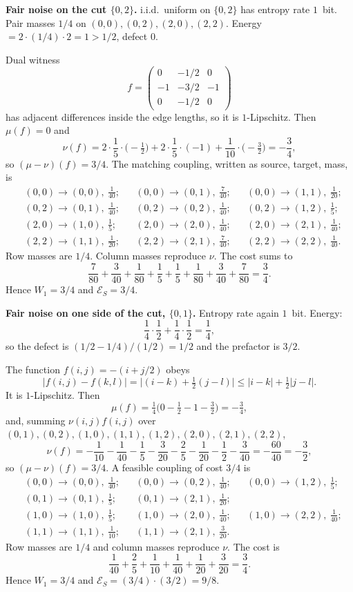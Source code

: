 \documentclass[11pt,reqno]{amsart}
\theoremstyle{remark}
\newcommand{\ES}{\mathcal{E}_S}
\begin{document}
\medskip\noindent\textbf{Fair noise on the cut $\{0,2\}$.} i.i.d.\ uniform on $\{0,2\}$ has entropy rate $1$~bit. Pair masses $1/4$ on $(0,0),(0,2),(2,0),(2,2)$. Energy $= 2\cdot(1/4)\cdot 2 = 1 > 1/2$, defect $0$.

Dual witness
\[
f = \begin{pmatrix}
0 & -1/2 & 0 \\
-1 & -3/2 & -1 \\
0 & -1/2 & 0
\end{pmatrix}
\]
has adjacent differences inside the edge lengths, so it is $1$-Lipschitz. Then $\mu(f) = 0$ and
\[
\nu(f)
= 2\cdot\frac15\cdot\bigl(-\tfrac12\bigr)
+ 2\cdot\frac15\cdot(-1)
+ \frac{1}{10}\cdot\bigl(-\tfrac32\bigr)
= -\frac{3}{4},
\]
so $(\mu-\nu)(f) = 3/4$. The matching coupling, written as source, target, mass, is
\begin{align*}
&(0,0)\to(0,0),\ \tfrac{1}{40};
&&(0,0)\to(0,1),\ \tfrac{7}{40};
&&(0,0)\to(1,1),\ \tfrac{1}{20};\\
&(0,2)\to(0,1),\ \tfrac{1}{40};
&&(0,2)\to(0,2),\ \tfrac{1}{40};
&&(0,2)\to(1,2),\ \tfrac15;\\
&(2,0)\to(1,0),\ \tfrac15;
&&(2,0)\to(2,0),\ \tfrac{1}{40};
&&(2,0)\to(2,1),\ \tfrac{1}{40};\\
&(2,2)\to(1,1),\ \tfrac{1}{20};
&&(2,2)\to(2,1),\ \tfrac{7}{40};
&&(2,2)\to(2,2),\ \tfrac{1}{40}.
\end{align*}
Row masses are $1/4$. Column masses reproduce $\nu$. The cost sums to
\[
\frac{7}{80}+\frac{3}{40}+\frac{1}{80}+\frac15+\frac15+\frac{1}{80}+\frac{3}{40}+\frac{7}{80} = \frac34.
\]
Hence $W_1 = 3/4$ and $\ES = 3/4$.

\medskip\noindent\textbf{Fair noise on one side of the cut, $\{0,1\}$.} Entropy rate again $1$~bit. Energy:
\[
\frac14 \cdot \frac12 + \frac14 \cdot \frac12 = \frac14,
\]
so the defect is $(1/2 - 1/4)/(1/2) = 1/2$ and the prefactor is $3/2$.

The function $f(i,j) = -(i + j/2)$ obeys
\[
|f(i,j)-f(k,l)| = \bigl|(i-k) + \tfrac12(j-l)\bigr| \le |i-k| + \tfrac12|j-l|.
\]
It is $1$-Lipschitz. Then
\[
\mu(f) = \tfrac14\bigl(0 - \tfrac12 - 1 - \tfrac32\bigr) = -\tfrac34,
\]
and, summing $\nu(i,j)f(i,j)$ over $(0,1),(0,2),(1,0),(1,1),(1,2),(2,0),(2,1),(2,2)$,
\[
\nu(f)
= -\frac{1}{10}-\frac{1}{40}-\frac15-\frac{3}{20}-\frac25-\frac{1}{20}-\frac12-\frac{3}{40}
= -\frac{60}{40}
= -\frac32,
\]
so $(\mu-\nu)(f) = 3/4$. A feasible coupling of cost $3/4$ is
\begin{align*}
&(0,0)\to(0,0),\ \tfrac{1}{40};
&&(0,0)\to(0,2),\ \tfrac{1}{40};
&&(0,0)\to(1,2),\ \tfrac15;\\
&(0,1)\to(0,1),\ \tfrac15;
&&(0,1)\to(2,1),\ \tfrac{1}{20};\\
&(1,0)\to(1,0),\ \tfrac15;
&&(1,0)\to(2,0),\ \tfrac{1}{40};
&&(1,0)\to(2,2),\ \tfrac{1}{40};\\
&(1,1)\to(1,1),\ \tfrac{1}{10};
&&(1,1)\to(2,1),\ \tfrac{3}{20}.
\end{align*}
Row masses are $1/4$ and column masses reproduce $\nu$. The cost is
\[
\frac{1}{40}+\frac25+\frac{1}{10}+\frac{1}{40}+\frac{1}{20}+\frac{3}{20} = \frac34.
\]
Hence $W_1 = 3/4$ and $\ES = (3/4)\cdot(3/2) = 9/8$.
\end{document}
